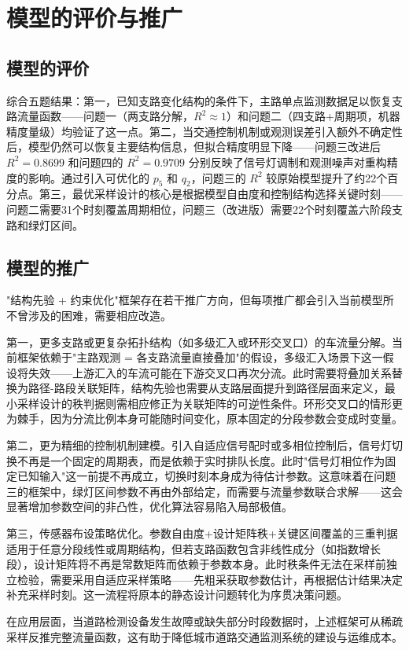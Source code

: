 \documentclass[UTF8,a4paper,fontset=none]{ctexart}
\numberwithin{equation}{section}
\begin{document}
\section{模型的评价与推广}
\subsection{模型的评价}
综合五题结果：第一，已知支路变化结构的条件下，主路单点监测数据足以恢复支路流量函数——问题一（两支路分解，$R^2\approx 1$）和问题二（四支路+周期项，机器精度量级）均验证了这一点。第二，当交通控制机制或观测误差引入额外不确定性后，模型仍然可以恢复主要结构信息，但拟合精度明显下降——问题三改进后 $R^2=0.8699$ 和问题四的 $R^2=0.9709$ 分别反映了信号灯调制和观测噪声对重构精度的影响。通过引入可优化的 $p_5$ 和 $q_2$，问题三的 $R^2$ 较原始模型提升了约22个百分点。第三，最优采样设计的核心是根据模型自由度和控制结构选择关键时刻——问题二需要31个时刻覆盖周期相位，问题三（改进版）需要22个时刻覆盖六阶段支路和绿灯区间。

\subsection{模型的推广}
"结构先验 + 约束优化"框架存在若干推广方向，但每项推广都会引入当前模型所不曾涉及的困难，需要相应改造。

第一，更多支路或更复杂拓扑结构（如多级汇入或环形交叉口）的车流量分解。当前框架依赖于"主路观测 = 各支路流量直接叠加"的假设，多级汇入场景下这一假设将失效——上游汇入的车流可能在下游交叉口再次分流。此时需要将叠加关系替换为路径-路段关联矩阵，结构先验也需要从支路层面提升到路径层面来定义，最小采样设计的秩判据则需相应修正为关联矩阵的可逆性条件。环形交叉口的情形更为棘手，因为分流比例本身可能随时间变化，原本固定的分段参数会变成时变量。

第二，更为精细的控制机制建模。引入自适应信号配时或多相位控制后，信号灯切换不再是一个固定的周期表，而是依赖于实时排队长度。此时"信号灯相位作为固定已知输入"这一前提不再成立，切换时刻本身成为待估计参数。这意味着在问题三的框架中，绿灯区间参数不再由外部给定，而需要与流量参数联合求解——这会显著增加参数空间的非凸性，优化算法容易陷入局部极值。

第三，传感器布设策略优化。参数自由度+设计矩阵秩+关键区间覆盖的三重判据适用于任意分段线性或周期结构，但若支路函数包含非线性成分（如指数增长段），设计矩阵将不再是常数矩阵而依赖于参数本身。此时秩条件无法在采样前独立检验，需要采用自适应采样策略——先粗采获取参数估计，再根据估计结果决定补充采样时刻。这一流程将原本的静态设计问题转化为序贯决策问题。

在应用层面，当道路检测设备发生故障或缺失部分时段数据时，上述框架可从稀疏采样反推完整流量函数，这有助于降低城市道路交通监测系统的建设与运维成本。
\end{document}
